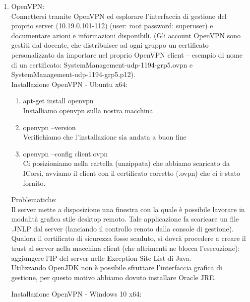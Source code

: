 \documentclass{article}
\begin{document}
\begin{enumerate} 

    \item OpenVPN:\\

    Connettersi tramite OpenVPN ed esplorare l’interfaccia di gestione del proprio
    server (10.19.0.101-112) (user: root password: superuser) e documentare
    azioni e informazioni disponibili.
    (Gli account OpenVPN sono gestiti dal docente, che distribuisce ad ogni gruppo
    un certificato personalizzato da importare nel proprio OpenVPN client – esempio
    di nome di un certificato: SystemManagement-udp-1194-grp5.ovpn e
    SystemManagement-udp-1194-grp5.p12).\\

   Installazione OpenVPN - Ubuntu x64:\\

    \begin{enumerate}
        \item apt-get install openvpn \\ 
        Installiamo openvpn sulla nostra macchina
        \item openvpn --version \\
        Verifichiamo che l'installazione sia andata a buon fine
        \item openvpn --config client.ovpn \\
        Ci posizioniamo nella cartella (unzippata) che abbiamo scaricato da ICorsi,
        avviamo il client con il certificato corretto (.ovpn) che ci è stato fornito.\\

    \end{enumerate}

    Problematiche: \\
    Il server mette a disposizione una finestra con la quale è possibile lavorare in modalità
    grafica stile desktop remoto. Tale applicazione fa scaricare un file .JNLP dal server
    (lanciando il controllo renoto dalla console di gestione). Qualora il certificato di
    sicurezza fosse scaduto, si dovrà procedere a creare il trust al server nella macchina
    client (che altrimenti ne blocca l’esecuzione): aggiungere l’IP del server nelle Exception
    Site List di Java. \\
    Utilizzando OpenJDK non è possibile sfruttare l'interfaccia grafica di gestione, per questo 
    motivo abbiamo dovuto installare Oracle JRE.

    Installazione OpenVPN - Windows 10 x64:\\



\end{enumerate}
\end{document}
